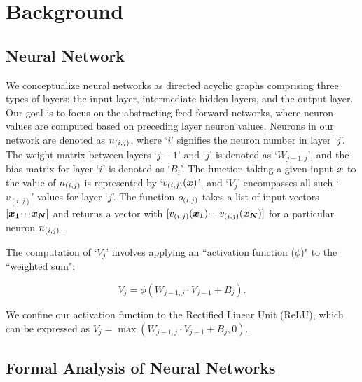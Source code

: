 \section{Background}
\subsection{Neural Network}



We conceptualize neural networks as directed acyclic graphs 
comprising three types of layers: the input layer, intermediate hidden layers, 
and the output layer. Our goal is to focus on the abstracting feed forward networks, 
where neuron values are computed based on preceding layer neuron values. 
Neurons in our network are denoted as $n_{(i,j)}$, where `$i$' signifies the 
neuron number in layer `$j$'.  %
The weight matrix between layers `${j-1}$' and `$j$' is denoted as `$W_{{j-1},
j}$', and the bias matrix for layer `$i$' is denoted as `$B_{i}$'. 
The function taking a given input $\boldsymbol{x}$ to the value of $n_{(i,j)}$ is
represented by `$v_{(i,j)}(\boldsymbol{x})$', %
and `$V_{j}$' encompasses all such `$v_{(i,j)}$' values for layer `$j$'. 
The function $o_{(i,j)}$ takes a list of input vectors
$[\boldsymbol{x_1} {\cdots} \boldsymbol{x_N}]$ and returns a vector with
$[v_{(i,j)}(\boldsymbol{x_1}) {\cdots} v_{(i,j)}(\boldsymbol{x_N})]$ for a particular
neuron $n_{(i,j)}$.  %

The computation of `$V_{j}$' involves applying an ``activation function ($\phi$)" 
to the ``weighted sum":

\[V_{j} = \phi(W_{{j-1}, j} \cdot V_{j-1} + B_{j}).\] 

We confine our activation function to the Rectified Linear Unit (ReLU), 
which can be expressed as $V_{j} = \max(W_{j-1, j} \cdot V_{j-1} + B_{j}, 0)$.

\subsection{ Formal Analysis of Neural Networks }
\label{s:form-an}

